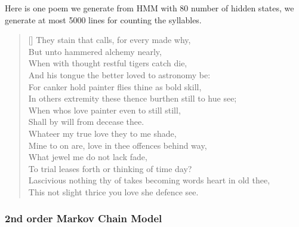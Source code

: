 Here is one poem we generate from HMM with 80 number of hidden states, we generate at most 5000 lines for counting the syllables. 
\renewcommand{\poemtoc}{subsection}
\settowidth{\versewidth}{Thy proud hearts slave and vassal wretch to be?}
\begin{verse}[\versewidth]
They stain that calls, for every made why,\\
But unto hammered alchemy nearly,\\
When with thought restful tigers catch die,\\
And his tongue the better loved to astronomy be:\\
\vspace{5pt}
For canker hold painter flies thine as bold skill,\\
In others extremity these thence burthen still to hue see;\\
When whos love painter even to still still,\\
Shall by will from decease thee.\\
\vspace{5pt}
Whateer my true love they to me shade,\\
Mine to on are, love in thee offences behind way,\\
What jewel me do not lack fade,\\
To trial leases forth or thinking of time day?\\
\vspace{5pt}
\vin  Lascivious nothing thy of takes becoming words heart in old thee,\\
\vin  This not slight thrice you love she defence see.\\
\end{verse}
\subsubsection{2nd order Markov Chain Model}
